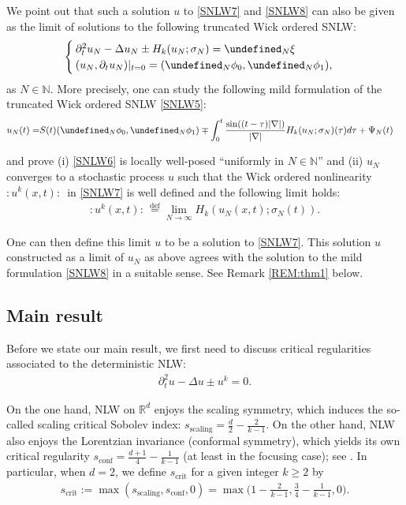 \documentclass[letterpaper, 11pt,  reqno]{amsart}
\newcommand{\1}{\hspace{0.5mm}\text{I}\hspace{0.5mm}}
\newcommand{\noi}{\noindent}
\newcommand{\R}{\mathbb{R}}
\let\P= \undefined
\newcommand{\P}{\mathbf{P}}
\newcommand{\Dl}{\Delta}
\newcommand{\dt}{\partial_t}
\newcommand{\N}{\mathbb{N}}
\numberwithin{equation}{section}
\numberwithin{theorem}{section}
\begin{document}
We point out that such a solution $u$ to \eqref{SNLW7}
and \eqref{SNLW8}
can also be given as the limit of solutions to 
the following truncated Wick ordered SNLW:
\begin{align}
\begin{cases}
\dt^2 u_N -  \Dl  u_N   \pm H_k(u_N;\sigma_N)  = \P_N \xi \\ 
(u_N, \dt u_N) |_{t = 0} = (\P_N\phi_0, \P_N\phi_1) , 
\end{cases}
\label{SNLW5}
\end{align}
as $N \in \N$. 
More precisely, 
one can study 
the following mild formulation of  the truncated Wick ordered SNLW \eqref{SNLW5}:
\begin{align}
u_N(t)= & S(t)(\P_N\phi_0,   \P_N \phi_1)
 \mp \int_{0}^t  \frac{\sin ((t-\tau)|\nabla|)}{|\nabla|} H_k(u_N;\sigma_N)(\tau) d\tau+ \Psi_N(t) 
\label{SNLW6}
\end{align}


\noi
and prove  (i) \eqref{SNLW6} is locally well-posed
``uniformly in $N \in \N$''
and  (ii) 
 $u_N$ converges to 
a stochastic process $u$ such that 
the Wick ordered nonlinearity $:\! u^k (x, t) \!: \,$ in \eqref{SNLW7}
is well defined  and 
the following limit holds:
\begin{align*}
:\! u^k  (x, t)\!: \,    \stackrel{\text{def}}{=} \lim_{N\to \infty}    H_k(u_N(x, t);\sigma_N(t)).
\end{align*}



\noi
One can then define
 this limit $u$ to be a solution to \eqref{SNLW7}.
This solution $u$ constructed as a limit of $u_N$ as above
agrees with the solution to the mild formulation \eqref{SNLW8}
in a suitable sense.
See Remark \ref{REM:thm1} below.




\subsection{Main result}

Before we state our main result, we first need to discuss
critical regularities associated to  the deterministic NLW:
\begin{align*}
\dt^2 u -  \Dl  u   \pm  u^k = 0.
\end{align*}

\noi
On the one hand, NLW on $\R^d$ enjoys the scaling symmetry, 
which induces the so-called scaling critical Sobolev index:
$s_\text{scaling} = \frac{d}{2} - \frac{2}{k-1}$.
On the other hand, NLW also enjoys
the Lorentzian invariance (conformal symmetry), 
which yields its own critical regularity 
$s_\text{conf} = \frac{d+1}{4} - \frac{1}{k-1}$
(at least in the focusing case);
see \cite{LS}.
\noi
In particular, when $d = 2$, we define $s_\text{crit}$ for a given integer $k \ge 2$ by 
\begin{align}\label{scrit}
s_\text{crit} := \max(s_\text{scaling}, s_\text{conf}, 0) = \max\bigg(1 - \frac{2}{k-1}, 
\frac 34 - \frac1{k-1}, 0\bigg).
\end{align}
\end{document}
